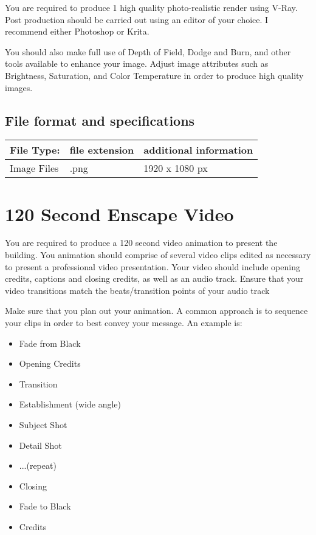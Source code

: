 You are required to produce 1 high quality photo-realistic render using V-Ray.  Post production should be carried out using an editor of your choice.  I recommend either Photoshop or Krita.

You should also make full use of Depth of Field, Dodge and Burn, and other tools available to enhance your image.  Adjust image attributes such as Brightness, Saturation, and Color Temperature in order to produce high quality images.

\subsection*{File format and specifications}

\begin{tabularx}{\textwidth}{ |X|X|X| }
	\hline
	\textbf{File Type:} & file extension & additional information\\
	\hline 
	Image Files  & .png & 1920 x 1080 px \\
	\hline
\end{tabularx}





\section*{120 Second Enscape Video}

You are required to produce a 120 second video animation to present the building.  You animation should comprise of several video clips edited as necessary to present a professional video presentation.  Your video should include opening credits, captions and closing credits, as well as an audio track.  Ensure that your video transitions match the beats/transition points of your audio track

Make sure that you plan out your animation. A common approach is to sequence your clips in order to best convey your message.  An example is:

\begin{itemize}
	\item Fade from Black
	\item Opening Credits
	\item Transition
	\item Establishment (wide angle)
	\item Subject Shot 
	\item Detail Shot
	\item ...(repeat)
	\item Closing 
	\item Fade to Black
	\item Credits
\end{itemize}




